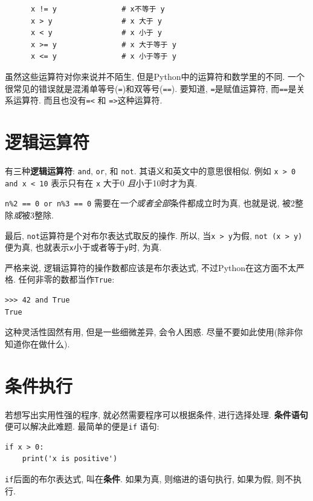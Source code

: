 \documentclass[10pt]{book}
\begin{document}
\begin{verbatim}
      x != y               # x不等于 y
      x > y                # x 大于 y
      x < y                # x 小于 y
      x >= y               # x 大于等于 y
      x <= y               # x 小于等于 y
\end{verbatim}
%
虽然这些运算符对你来说并不陌生, 但是Python中的运算符和数学里的不同. 
一个很常见的错误就是混淆单等号({\tt =})和双等号({\tt ==}). 
要知道,  {\tt =}是赋值运算符, 而{\tt ==}是关系运算符. 
而且也没有{\tt =<} 和 {\tt =>}这种运算符. 


\section {逻辑运算符}

有三种{\bf 逻辑运算符}: {\tt and}, {\tt or}, 和 {\tt not}.
其语义和英文中的意思很相似. 例如
{\tt x > 0 and x < 10} 表示只有在 {\tt x} 大于0 {\em 且}小于10时才为真.

{\tt n\%2 == 0 or n\%3 == 0} 需要在{\em 一个或者全部}条件都成立时为真, 
也就是说, 被2整除{\em 或}被3整除. 

最后, {\tt not}运算符是个对布尔表达式取反的操作. 
所以, 当{\tt x > y}为假,  {\tt not (x > y)}便为真, 
也就表示{\tt x}小于或者等于{\tt y}时, 为真.

严格来说, 逻辑运算符的操作数都应该是布尔表达式, 不过Python在这方面不太严格. 
任何非零的数都当作{\tt True}:

\begin{verbatim}
>>> 42 and True
True
\end{verbatim}
%
这种灵活性固然有用, 但是一些细微差异, 会令人困惑. 
尽量不要如此使用(除非你知道你在做什么).


\section{条件执行}
\label{conditional.execution}

若想写出实用性强的程序, 就必然需要程序可以根据条件, 进行选择处理. 
{\bf 条件语句} 便可以解决此难题. 
最简单的便是{\tt if} 语句:

\begin{verbatim}
if x > 0:
    print('x is positive')
\end{verbatim}
%
{\tt if}后面的布尔表达式, 叫在{\bf 条件}. 
如果为真, 则缩进的语句执行, 如果为假, 则不执行. 
\end{document}
